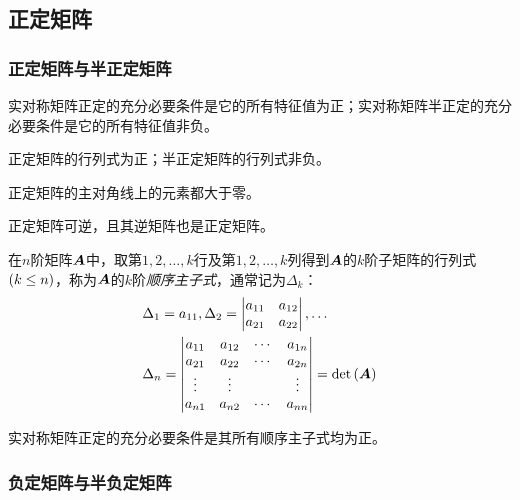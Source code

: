 \documentclass{ctexart}
\begin{document}
\subsection{正定矩阵}

\subsubsection*{正定矩阵与半正定矩阵}

\begin{theorem}
    实对称矩阵正定的充分必要条件是它的所有特征值为正；实对称矩阵半正定的充分必要条件是它的所有特征值非负。
\end{theorem}

\begin{property}
    正定矩阵的行列式为正；半正定矩阵的行列式非负。
\end{property}

\begin{property}
    正定矩阵的主对角线上的元素都大于零。
\end{property}

\begin{property}
    正定矩阵可逆，且其逆矩阵也是正定矩阵。
\end{property}

\begin{definition}[顺序主子式]
    在\(n\)阶矩阵\(\mata\)中，取第\(1,2,\dots,k\)行及第\(1,2,\dots,k\)列得到\(\mata\)的\(k\)阶子矩阵的行列式\(\mypar{k\le n}\)，称为\(\mata\)的\(k\)阶\emph{顺序主子式}，通常记为\(\Delta_k\)：
    \begin{align*}
         & \Delta_1=a_{11},\Delta_2=\begin{vmatrix}
                                        a_{11} & a_{12} \\a_{21}&a_{22}
                                    \end{vmatrix},\dots \\
         & \Delta_n=\sqmat{vmatrix}{a}{n}=\det{\mata}
    \end{align*}
\end{definition}

\begin{theorem}
    实对称矩阵正定的充分必要条件是其所有顺序主子式均为正。
\end{theorem}

\subsubsection*{负定矩阵与半负定矩阵}
\end{document}
